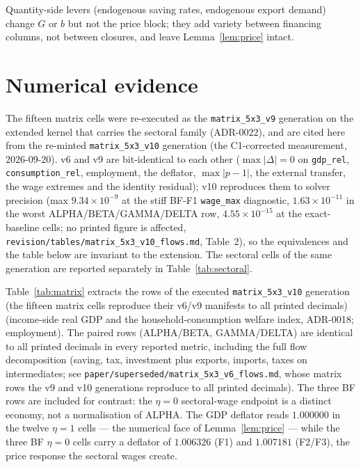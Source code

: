 \documentclass[11pt]{article}
\numberwithin{equation}{section}
\begin{document}
Quantity-side levers (endogenous saving rates, endogenous export demand)
change $G$ or $b$ but not the price block; they add variety between
financing columns, not between closures, and leave Lemma~\ref{lem:price}
intact.

\section{Numerical evidence}\label{sec:conclusion}

\textcolor{revisionV2}{The fifteen matrix cells were re-executed as the
\texttt{matrix\_5x3\_v9} generation on the extended kernel that carries the
sectoral family (ADR-0022), and are cited here from the
\textcolor{revisionV3}{re-minted \texttt{matrix\_5x3\_v10} generation (the
C1-corrected measurement, 2026-09-20). v6 and v9 are bit-identical to each
other ($\max|\Delta| = 0$ on \texttt{gdp\_rel}, \texttt{consumption\_rel},
employment, the deflator, $\max|p-1|$, the external transfer, the wage extremes
and the identity residual); v10 reproduces them to solver precision (max
$9.34\times10^{-9}$ at the stiff BF-F1 \texttt{wage\_max} diagnostic,
$1.63\times10^{-11}$ in the worst ALPHA/BETA/GAMMA/DELTA row,
$4.55\times10^{-15}$ at the exact-baseline cells; no printed figure is
affected, \texttt{revision/tables/matrix\_5x3\_v10\_flows.md}, Table~2), so the
equivalences and the table below are invariant to the extension. The sectoral
cells of the same generation are reported separately in
Table~\ref{tab:sectoral}.}}

Table~\ref{tab:matrix} extracts the rows of the executed
\texttt{matrix\_5x3\_v10} generation \textcolor{revisionV3}{(the fifteen matrix
cells reproduce their v6/v9 manifests to all printed decimals)} (income-side real GDP and the
household-consumption welfare index, ADR-0018; employment). The paired rows
(ALPHA/BETA, GAMMA/DELTA) are identical to all printed decimals in every
reported metric, including the full flow decomposition (saving, tax,
investment plus exports, imports, taxes on intermediates; see
\texttt{paper/superseded/matrix\_5x3\_v6\_flows.md}, whose matrix rows the v9 and v10
generations reproduce to all printed decimals). \textcolor{revisionV1}{The
three BF rows are included for contrast: the $\eta = 0$ sectoral-wage
endpoint is a distinct economy, not a normalisation of ALPHA.} The GDP
deflator reads $1.000000$ in \textcolor{revisionV1}{the twelve $\eta = 1$
cells --- the numerical face of Lemma~\ref{lem:price} --- while the three BF
$\eta = 0$ cells carry a deflator of $1.006326$ (F1) and $1.007181$
(F2/F3), the price response the sectoral wages create.}
\end{document}
